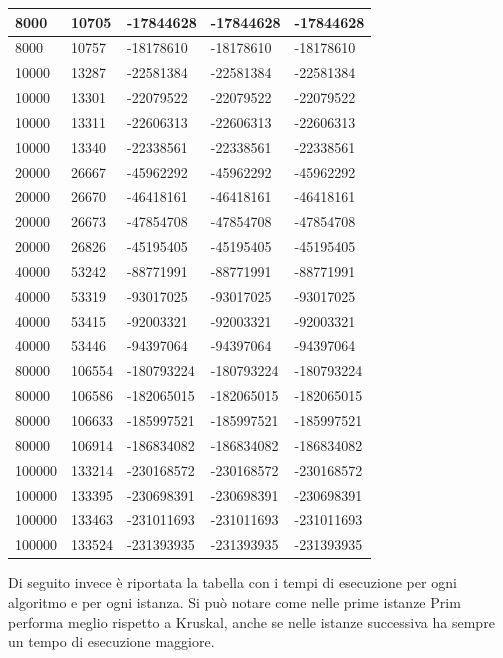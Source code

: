 \begin{longtable}[H]{|p{1.5cm}|p{1.5cm}|p{2cm}|p{3cm}|p{4cm}|}
    8000 & 10705 & -17844628 & -17844628 & -17844628 \\ \hline
    8000 & 10757 & -18178610 & -18178610 & -18178610 \\ \hline  
    10000 & 13287 & -22581384 & -22581384 & -22581384 \\ \hline
    10000 & 13301 & -22079522 & -22079522 & -22079522 \\ \hline
    10000 & 13311 & -22606313 & -22606313 & -22606313 \\ \hline
    10000 & 13340 & -22338561 & -22338561 & -22338561 \\ \hline 
    20000 & 26667 & -45962292 & -45962292 & -45962292 \\ \hline
    20000 & 26670 & -46418161 & -46418161 & -46418161 \\ \hline
    20000 & 26673 & -47854708 & -47854708 & -47854708 \\ \hline
    20000 & 26826 & -45195405 & -45195405 & -45195405 \\ \hline
    40000 & 53242 & -88771991 & -88771991 & -88771991 \\ \hline
    40000 & 53319 & -93017025 & -93017025 & -93017025 \\ \hline
    40000 & 53415 & -92003321 & -92003321 & -92003321 \\ \hline
    40000 & 53446 & -94397064 & -94397064 & -94397064 \\ \hline
    80000 & 106554 & -180793224 & -180793224 & -180793224 \\ \hline 
    80000 & 106586 & -182065015 & -182065015 & -182065015 \\ \hline 
    80000 & 106633 & -185997521 & -185997521 & -185997521 \\ \hline
    80000 & 106914 & -186834082 & -186834082 & -186834082 \\ \hline
    100000 & 133214 & -230168572 & -230168572 & -230168572 \\ \hline
    100000 & 133395 & -230698391 & -230698391 & -230698391 \\ \hline
    100000 & 133463 & -231011693 & -231011693 & -231011693 \\ \hline
    100000 & 133524 & -231393935 & -231393935 & -231393935  \\ \hline
\end{longtable}
Di seguito invece è riportata la tabella con i tempi di esecuzione per ogni algoritmo e per ogni istanza. Si può notare come nelle prime istanze Prim performa meglio rispetto a Kruskal, anche se nelle istanze successiva ha sempre un tempo di esecuzione maggiore.
